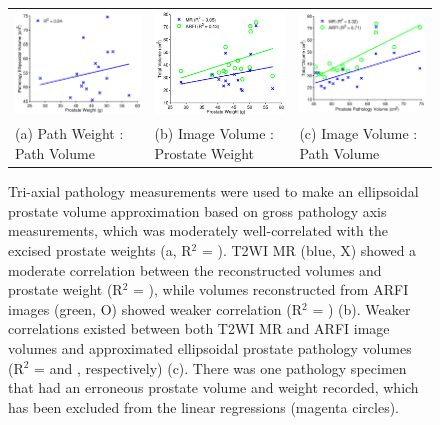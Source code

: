 \begin{figure}[htb!]
\centering
\begin{tabular}{lll}
\includegraphics[width=0.3\linewidth]{figs/corr_path_vol_weight_vol} &
\includegraphics[width=0.3\linewidth]{figs/corr_weight_vol} &
\includegraphics[width=0.3\linewidth]{figs/corr_pathVol_vol} \\
(a) Path Weight : Path Volume & (b) Image Volume : Prostate Weight & (c) Image Volume : Path Volume \\
\end{tabular}
\caption{Tri-axial pathology measurements were used to make an ellipsoidal
    prostate volume approximation based on gross pathology axis measurements,
    which was moderately well-correlated with the excised prostate weights (a,
    R$^2$ = \pathVolWeightRsq).  T2WI MR (blue, X) showed a moderate
    correlation between the reconstructed volumes and prostate weight (R$^2$ =
    \weightMRrsq), while volumes reconstructed from ARFI images (green, O)
    showed weaker correlation (R$^2$ = \weightARFIrsq) (b).  Weaker
    correlations existed between both T2WI MR and ARFI image volumes and
    approximated ellipsoidal prostate pathology volumes (R$^2$ = \pathVolMRrsq
    and \pathVolARFIrsq, respectively) (c).  There was one pathology specimen
    that had an erroneous prostate volume and weight recorded, which has been
    excluded from the linear regressions (magenta circles).}
\label{fig:mr_arfi_weight}
\end{figure}
